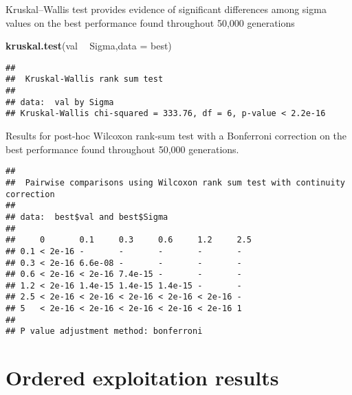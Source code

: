 \documentclass[]{book}
\newenvironment{Shaded}{\begin{snugshade}}{\end{snugshade}}
\newcommand{\DataTypeTok}[1]{\textcolor[rgb]{0.13,0.29,0.53}{#1}}
\newcommand{\KeywordTok}[1]{\textcolor[rgb]{0.13,0.29,0.53}{\textbf{#1}}}
\newcommand{\NormalTok}[1]{#1}
\newcommand{\OperatorTok}[1]{\textcolor[rgb]{0.81,0.36,0.00}{\textbf{#1}}}
\newcommand{\OtherTok}[1]{\textcolor[rgb]{0.56,0.35,0.01}{#1}}
\newcommand{\StringTok}[1]{\textcolor[rgb]{0.31,0.60,0.02}{#1}}
\begin{document}
Kruskal--Wallis test provides evidence of significant differences among sigma values on the best performance found throughout 50,000 generations

\begin{Shaded}
\begin{Highlighting}[]
\KeywordTok{kruskal.test}\NormalTok{(val }\OperatorTok{~}\StringTok{ }\NormalTok{Sigma,}\DataTypeTok{data =}\NormalTok{ best)}
\end{Highlighting}
\end{Shaded}

\begin{verbatim}
## 
##  Kruskal-Wallis rank sum test
## 
## data:  val by Sigma
## Kruskal-Wallis chi-squared = 333.76, df = 6, p-value < 2.2e-16
\end{verbatim}

Results for post-hoc Wilcoxon rank-sum test with a Bonferroni correction on the best performance found throughout 50,000 generations.

\begin{Shaded}
\end{Shaded}

\begin{verbatim}
## 
##  Pairwise comparisons using Wilcoxon rank sum test with continuity correction 
## 
## data:  best$val and best$Sigma 
## 
##     0       0.1     0.3     0.6     1.2     2.5
## 0.1 < 2e-16 -       -       -       -       -  
## 0.3 < 2e-16 6.6e-08 -       -       -       -  
## 0.6 < 2e-16 < 2e-16 7.4e-15 -       -       -  
## 1.2 < 2e-16 1.4e-15 1.4e-15 1.4e-15 -       -  
## 2.5 < 2e-16 < 2e-16 < 2e-16 < 2e-16 < 2e-16 -  
## 5   < 2e-16 < 2e-16 < 2e-16 < 2e-16 < 2e-16 1  
## 
## P value adjustment method: bonferroni
\end{verbatim}

\hypertarget{ordered-exploitation-results-3}{%
\section{Ordered exploitation results}\label{ordered-exploitation-results-3}}
\end{document}
